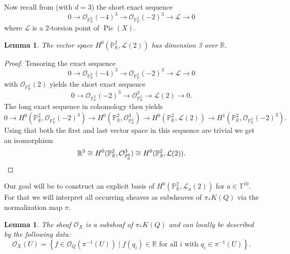 \documentclass[a4paper,10pt]{amsart}
\theoremstyle{definition}
\theoremstyle{plain}
\newtheorem{lem}[Def]{Lemma}
\newcommand{\Pic}{\operatorname{Pic}}
\newcommand{\cL}{{\mathcal L}}
\newcommand{\cO}{{\mathcal O}}
\newcommand{\R}{{\mathbb R}}
\newcommand{\pp}{\mathbb{P}}
\begin{document}
Now recall from  (with $d=3$) the short exact sequence
\begin{equation*}
 0\to\cO_{\pp^2_\R}(-4)^3\to\cO_{\pp^2_\R}(-2)^3\to\cL\to0
\end{equation*}
where $\cL$ is a 2-torsion point of $\Pic(X)$.

\begin{lem}\label{lem:globalsec}
 The vector space $H^0(\pp^2_\R, \cL(2))$ has dimension 3 over $\R$.
\end{lem}

\begin{proof}
 Tensoring the exact sequence
 \begin{equation*}
  0\to\cO_{\pp^2_\R}(-4)^3\to\cO_{\pp^2_\R}(-2)^3\to\cL\to0
 \end{equation*}
 with $\cO_{\pp^2_\R}(2)$ yields the short exact sequence
\begin{equation*}
 0\to\cO_{\pp^2_\R}(-2)^3\to\cO_{\pp^2_\R}^3\to\cL(2)\to0.
\end{equation*}
The long exact sequence in cohomology then yields
\begin{equation*}
 0 \to
 H^0(\pp^2_\R, \cO_{\pp^2_\R}(-2)^3) \to H^0(\pp^2_\R, \cO_{\pp^2_\R}^3) \to H^0(\pp^2_\R, \cL(2)) \to
 H^1(\pp^2_\R, \cO_{\pp^2_\R}(-2)^3).
\end{equation*}
Using that both the first and last vector space in this sequence are trivial we get an isomorphism
\begin{equation*}
 \R^3 \cong H^0(\pp^2_\R, \cO_{\pp^2_\R}^3) \cong H^0(\pp^2_\R, \cL(2)).\qedhere
\end{equation*}
\end{proof}

Our goal will be to construct an explicit basis of $H^0(\pp^2_\R, \cL_a(2))$ for $a\in\mathbb{T}^{10}$. For that we will interpret all occurring sheaves as subsheaves of $\pi_*K(Q)$ via the normalization map $\pi$.

\begin{lem}\label{lem:identifyO}
 The sheaf $\cO_X$ is a subsheaf of $\pi_*K(Q)$ and can locally be described by the following data:
 \begin{equation*}
  \cO_X(U) = \left\lbrace f \in\cO_Q(\pi^{-1}(U)) \mid f(q_i) \in \R \text{ for all } i \text{ with } q_i \in \pi^{-1}(U) \right\rbrace.
 \end{equation*}
\end{lem}
\end{document}
